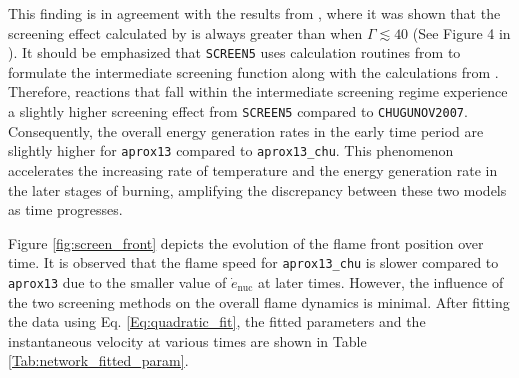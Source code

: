 \documentclass[preprint,times,tighten,linenumbers]{aastex631}
\begin{document}
This finding is in agreement with the results from \cite{Chugunov_2007}, where it was shown that the screening effect calculated by \cite{Alastuey_Jancovici:1978} is always greater than \cite{Chugunov_2007} when $\Gamma \lesssim 40$ (See Figure 4 in \cite{Chugunov_2007}). 
It should be emphasized that {\tt SCREEN5} uses calculation routines from \cite{Alastuey_Jancovici:1978} to formulate the intermediate screening function along with the calculations from \cite{Graboske_1973}. Therefore, reactions that fall within the intermediate screening regime experience a slightly higher screening effect from {\tt SCREEN5} compared to {\tt CHUGUNOV2007}. Consequently, the overall energy generation rates in the early time period are slightly higher for {\tt aprox13} compared to {\tt aprox13\_chu}. This phenomenon accelerates the increasing rate of temperature and the energy generation rate in the later stages of burning, amplifying the discrepancy between these two models as time progresses.





\begin{figure*}
\centering
{}
\caption{\label{fig:screen_front} Flame front position as a function of time for {\tt aprox13} and {\tt aprox13\_chu}. The dashed lines are the fitted curves using Eq. \ref{Eq:quadratic_fit}.}
\end{figure*}

Figure \ref{fig:screen_front} depicts the evolution of the flame front position over time. It is observed that the flame speed for {\tt aprox13\_chu} is slower compared to {\tt aprox13} due to the smaller value of $\dot{e}_{\textrm{nuc}}$ at later times. However, the influence of the two screening methods on the overall flame dynamics is minimal. After fitting the data using Eq. \ref{Eq:quadratic_fit}, the fitted parameters and the instantaneous velocity at various times are shown in Table \ref{Tab:network_fitted_param}. 
\end{document}
